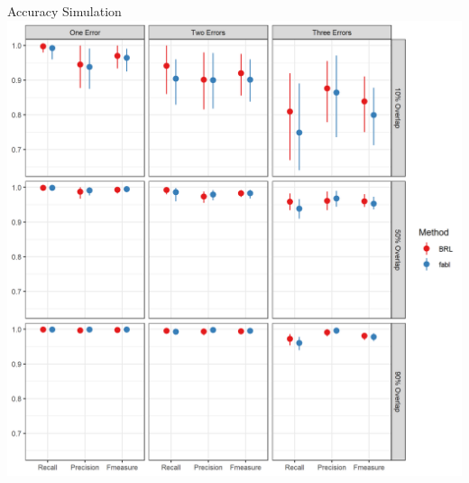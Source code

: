 \documentclass{beamer}
\begin{document}
\begin{frame}{Accuracy Simulation}
	\includegraphics[width = \textwidth, height = .7\textwidth ]{../notes/figures/sadinle_sim_plot2.png}
\end{frame}

%
\end{document}
